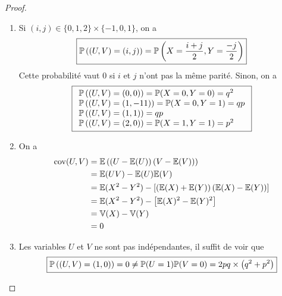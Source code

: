 \begin{proof}
    \phantom{}
    \begin{enumerate}
        \item Si $(i,j)\in\lbrace0,1,2\rbrace\times\lbrace-1,0,1\rbrace$, on a 
        \begin{equation}
            \boxed{\P\left((U,V)=(i,j)\right)=\P\left(X=\frac{i+j}{2},Y=\frac{-j}{2}\right)}
        \end{equation}
        Cette probabilité vaut 0 si $i$ et $j$ n'ont pas la même parité. Sinon, on a 
        \begin{equation}
            \boxed{
                \begin{array}[]{l}
                    \P\left((U,V)=(0,0)\right)=\P(X=0,Y=0)=q^{2}\\
                    \P\left((U,V)=(1,-11)\right)=\P(X=0,Y=1)=qp\\
                    \P\left((U,V)=(1,1)\right)=qp\\
                    \P\left((U,V)=(2,0)\right)=\P(X=1,Y=1)=p^{2}\\
                \end{array}
            }
        \end{equation}

        \item On a 
        \begin{align}
            \mathrm{cov}(U,V)
            &=\E\left(\left(U-\E(U)\right)\left(V-\E(V)\right)\right)\\
            &=\E(UV)-\E(U)\E(V)\\
            &=\E(X^{2}-Y^{2})-\left[\left(\E(X)+\E(Y)\right)\left(\E(X)-\E(Y)\right)\right]\\
            &=\E(X^{2}-Y^{2})-\left[\E(X)^{2}-\E(Y)^{2}\right]\\
            &=\mathbb{V}(X)-\mathbb{V}(Y)\\
            &=0
        \end{align}

        \item Les variables $U$ et $V$ ne sont pas indépendantes, il suffit de voir que 
        \begin{equation}
            \boxed{\P\left((U,V)=(1,0)\right)=0\neq\P(U=1)\P(V=0)=2pq\times\left(q^{2}+p^{2}\right)}
        \end{equation}
    \end{enumerate}
\end{proof}


